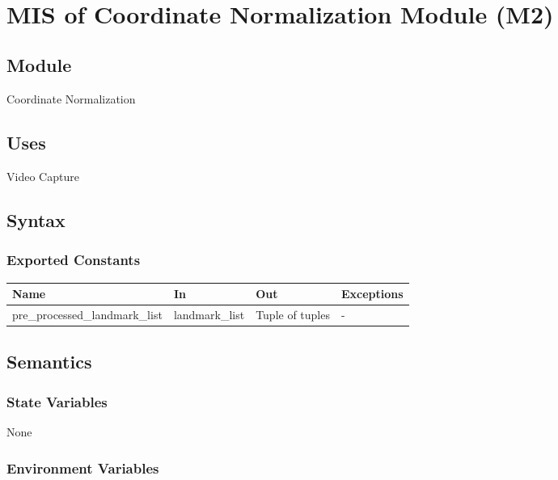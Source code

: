\documentclass[12pt, titlepage]{article}
\begin{document}
~\newpage

\section{MIS of Coordinate Normalization Module (M2)} \label{M2}

\subsection{Module}

Coordinate Normalization

\subsection{Uses}

Video Capture\\

\subsection{Syntax}

\subsubsection{Exported Constants}

\begin{center}
\begin{tabular}{p{5cm} p{4cm} p{4cm} p{2cm}}
\hline
\textbf{Name} & \textbf{In} & \textbf{Out} & \textbf{Exceptions} \\
\hline
pre\_processed\_landmark\_list & landmark\_list & Tuple of tuples & - \\
\hline
\end{tabular}
\end{center}

\subsection{Semantics}

\subsubsection{State Variables}

None\\

\subsubsection{Environment Variables}
\end{document}
